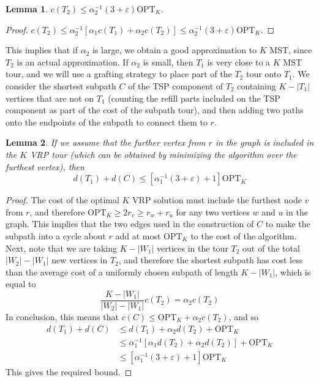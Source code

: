 \documentclass{article}
\theoremstyle{plain}
\newtheorem{lemma}{Lemma}
\theoremstyle{plain}
\begin{document}
\begin{lemma}
    $c(T_2) \leq \alpha_2^{-1}(3 + \varepsilon) \text{OPT}_K$.
\end{lemma}
\begin{proof}
    $c(T_2) \leq \alpha_2^{-1}[\alpha_1 c(T_1) + \alpha_2 c(T_2)] \leq \alpha_2^{-1} (3 + \varepsilon) \text{OPT}_K$.
\end{proof}

This implies that if $\alpha_2$ is large, we obtain a good approximation to $K$ MST, since $T_2$ is an actual approximation. If $\alpha_2$ is small, then $T_1$ is very close to a $K$ MST tour, and we will use a grafting strategy to place part of the $T_2$ tour onto $T_1$. We consider the shortest subpath $C$ of the TSP component of $T_2$ containing $K - |T_1|$ vertices that are not on $T_1$ (counting the refill parts included on the TSP component as part of the cost of the subpath tour), and then adding two paths onto the endpoints of the subpath to connect them to $r$.

\begin{lemma}
    If we assume that the further vertex from $r$ in the graph is included in the $K$ VRP tour (which can be obtained by minimizing the algorithm over the furthest vertex), then
    \[ d(T_1) + d(C) \leq [\alpha_1^{-1} (3 + \varepsilon) + 1] \text{OPT}_K \]
\end{lemma}
\begin{proof}
    The cost of the optimal $K$ VRP solution must include the furthest node $v$ from $r$, and therefore $\text{OPT}_K \geq 2r_v \geq r_w + r_u$ for any two vertices $w$ and $u$ in the graph. This implies that the two edges used in the construction of $C$ to make the subpath into a cycle about $r$ add at most $\text{OPT}_K$ to the cost of the algorithm. Next, note that we are taking $K - |W_1|$ vertices in the tour $T_2$ out of the total $|W_2| - |W_1|$ new vertices in $T_2$, and therefore the shortest subpath has cost less than the average cost of a uniformly chosen subpath of length $K - |W_1|$, which is equal to
    \[ \frac{K - |W_1|}{|W_2| - |W_1|} c(T_2) = \alpha_2 c(T_2) \]
    In conclusion, this means that $c(C) \leq \text{OPT}_K + \alpha_2 c(T_2)$, and so
    \begin{align*}
        d(T_1) + d(C) &\leq d(T_1) + \alpha_2 d(T_2) + \text{OPT}_K\\
        &\leq \alpha_1^{-1}[\alpha_1 d(T_2) + \alpha_2 d(T_2)] + \text{OPT}_K\\
        &\leq [\alpha_1^{-1} (3 + \varepsilon) + 1] \text{OPT}_K
    \end{align*}
    This gives the required bound.
\end{proof}
\end{document}
